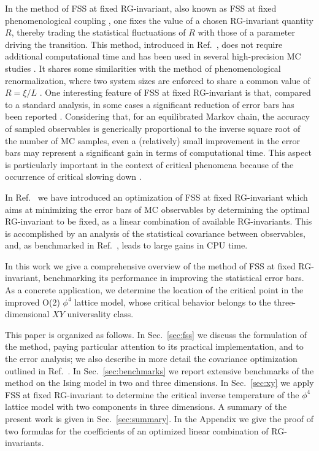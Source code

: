 \documentclass[pre,twocolumn]{revtex4-2}
\begin{document}
In the method of FSS at fixed RG-invariant, also known as FSS at fixed phenomenological coupling \cite{Hasenbusch-99}, one fixes the value of a chosen RG-invariant quantity $R$, thereby trading the statistical fluctuations of $R$ with those of a parameter driving the transition.
This method, introduced in Ref.~\cite{Hasenbusch-99}, does not require additional computational time and has been used in several high-precision MC studies \cite{HPV-05,CHPV-06,HPTPV-07,HPTPV-07b,HPTPV-08b,Wolff-09c,Hasenbusch-10,Hasenbusch-19,Hasenbusch-20,PT-20}.
It shares some similarities with the method of phenomenological renormalization, where two system sizes are enforced to share a common value of $R=\xi/L$ \cite{Nightingale-76,Nightingale-77}.
One interesting feature of FSS at fixed RG-invariant is that, compared to a standard analysis, in some cases a significant reduction of error bars has been reported \cite{HPV-05,HPTPV-07,Wolff-09c,PT-11}.
Considering that, for an equilibrated Markov chain, the accuracy of sampled observables is generically proportional to the inverse square root of the number of MC samples, even a (relatively) small improvement in the error bars may represent a significant gain in terms of computational time.
This aspect is particularly important in the context of critical phenomena because of the occurrence of critical slowing down \cite{Sokal_lecture}.

In Ref.~\cite{PT-11} we have introduced an optimization of FSS at fixed RG-invariant which aims at minimizing the error bars of MC observables by determining the optimal RG-invariant to be fixed, as a linear combination of available RG-invariants.
This is accomplished by an analysis of the statistical covariance between observables, and, as benchmarked in Ref.~\cite{PT-11}, leads to large gains in CPU time.

In this work we give a comprehensive overview of the method of FSS at fixed RG-invariant, benchmarking its performance in improving the statistical error bars.
As a concrete application, we determine the location of the critical point in the improved O(2) $\phi^4$ lattice model, whose critical behavior belongs to the three-dimensional $XY$ universality class.

This paper is organized as follows.
In Sec.~\ref{sec:fss} we discuss the formulation of the method, paying particular attention to its practical implementation, and to the error analysis;
 we also describe in more detail the covariance optimization outlined in Ref.~\cite{PT-11}.
In Sec.~\ref{sec:benchmarks} we report extensive benchmarks of the method on the Ising model in two and three dimensions.
In Sec.~\ref{sec:xy} we apply FSS at fixed RG-invariant to determine the critical inverse temperature of the $\phi^4$ lattice model with two components in three dimensions.
A summary of the present work is given in Sec.~\ref{sec:summary}.
In the Appendix we give the proof of two formulas for the coefficients of an optimized linear combination of RG-invariants.
\end{document}
